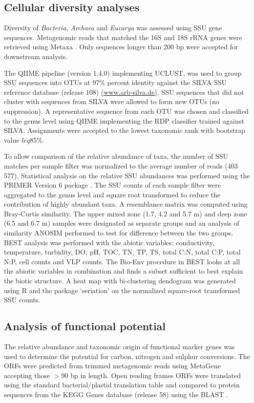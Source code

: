 \subsection{Cellular diversity analyses}
Diversity of \emph{Bacteria}, \emph{Archaea} and \emph{Eucarya} was assessed using \ac{SSU} gene sequences. 
Metagenomic reads that matched the 16S and 18S \ac{rRNA} genes were retrieved using Metaxa \cite{Bengtsson2011}. 
Only sequences longer than 200 bp were accepted for downstream analysis. 

The \ac{QIIME} pipeline (version 1.4.0) \cite{Caporaso2010} implementing UCLUST, was used to group \ac{SSU} sequences into \acp{OTU} at 97\% percent identity against the SILVA \ac{SSU} reference database (release 108)
\url{(www.arb-silva.de)}. 
\ac{SSU} sequences that did not cluster with sequences from SILVA were allowed to form new \acp{OTU} (no suppression). 
A representative sequence from each \ac{OTU} was chosen and classified to the genus level using \ac{QIIME} implementing the \ac{RDP} classifier \cite{Wang2007} trained against SILVA. 
Assignments were accepted to the lowest taxonomic rank with bootstrap value $leq$85\%. 

To allow comparison of the relative abundance of taxa, the number of \ac{SSU} matches per sample filter was normalized to the average number of reads (403 577). 
Statistical analysis on the relative \ac{SSU} abundances was performed using the PRIMER Version 6 package \cite{Clarke2006}. 
The \ac{SSU} counts of each sample filter were aggregated to the genus level and square root transformed to reduce the contribution of highly abundant taxa. 
A resemblance matrix was computed using Bray-Curtis similarity. 
The upper mixed zone (1.7, 4.2 and 5.7 m) and deep zone (6.5 and 6.7 m) samples were designated as separate groups and an analysis of similarity \ac{ANOSIM} performed to test for difference between the two groups. 
BEST analysis was performed with the abiotic variables: conductivity, temperature, turbidity, \ac{DO}, pH, \ac{TOC}, \ac{TN}, \ac{TP}, \ac{TS}, total C:N, total C:P, total N:P, cell counts and \ac{VLP} counts. 
The Bio-Env procedure in BEST looks at all the abiotic variables in combination and finds a subset sufficient to best explain the biotic structure. 
A heat map with bi-clustering dendogram was generated using R and the package ‘seriation’ \cite{Hahsler2008} on the normalized square-root transformed \ac{SSU} counts.

\subsection{Analysis of functional potential}
The relative abundance and taxonomic origin of functional marker genes was used to determine the potential for carbon, nitrogen and sulphur conversions.
The \acp{ORF} were predicted from trimmed metagenomic reads using MetaGene \cite{Noguchi2006} accepting those $>$90 bp in length. 
Open reading frames \acsp{ORF} were translated using the standard bacterial/plastid translation table and compared to protein sequences from the \ac{KEGG} Genes database (release 58) using the \ac{BLAST} \cite{Altschul1990}. 

